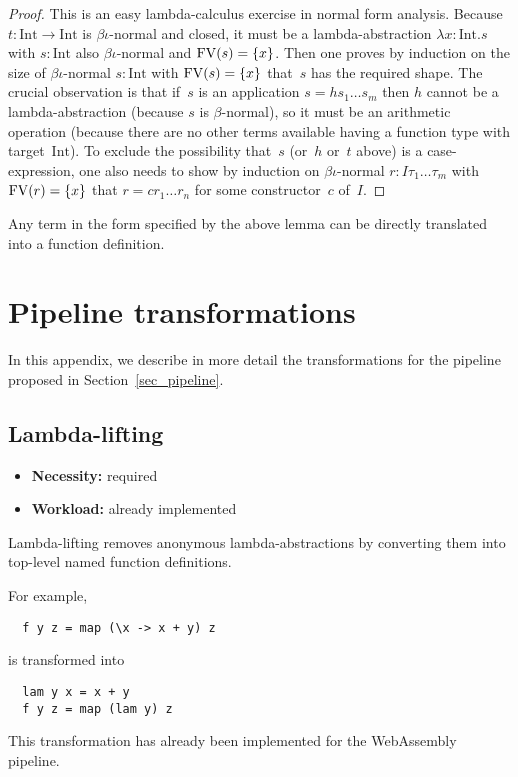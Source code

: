 \documentclass[
    9pt,            %
    techreport,        %
    affiltop,       %
]{art}
\begin{document}
\begin{proof}
  This is an easy lambda-calculus exercise in normal form
  analysis. Because $t : \mathrm{Int} \to \mathrm{Int}$ is
  $\beta\iota$-normal and closed, it must be a lambda-abstraction
  $\lambda x : \mathrm{Int} . s$ with $s : \mathrm{Int}$ also
  $\beta\iota$-normal and $\mathrm{FV}(s) = \{x\}$. Then one proves by
  induction on the size of $\beta\iota$-normal $s : \mathrm{Int}$ with
  $\mathrm{FV}(s) = \{x\}$ that~$s$ has the required shape. The crucial
  observation is that if~$s$ is an application $s = h s_1 \ldots s_m$
  then $h$ cannot be a lambda-abstraction (because $s$ is
  $\beta$-normal), so it must be an arithmetic operation (because
  there are no other terms available having a function type with
  target~$\mathrm{Int}$). To exclude the possibility that~$s$ (or~$h$
  or~$t$ above) is a case-expression, one also needs to show by
  induction on $\beta\iota$-normal $r : I \tau_1 \ldots \tau_m$ with
  $\mathrm{FV}(r) = \{x\}$ that $r = c r_1 \ldots r_n$ for some constructor~$c$
  of~$I$.
\end{proof}

Any term in the form specified by the above lemma can be directly
translated into a \VampIR{} function definition.

\section{Pipeline transformations}\label{sec_transformations}

In this appendix, we describe in more detail the transformations for
the pipeline proposed in Section~\ref{sec_pipeline}.

\subsection{Lambda-lifting}

\begin{itemize}
\item {\bf Necessity:} required
\item {\bf Workload:} already implemented
\end{itemize}

\noindent Lambda-lifting removes anonymous lambda-abstractions by converting
them into top-level named function definitions.

\medskip

\noindent For example,
\begin{verbatim}
  f y z = map (\x -> x + y) z
\end{verbatim}
is transformed into
\begin{verbatim}
  lam y x = x + y
  f y z = map (lam y) z
\end{verbatim}
This transformation has already been implemented for the WebAssembly pipeline.
\end{document}
